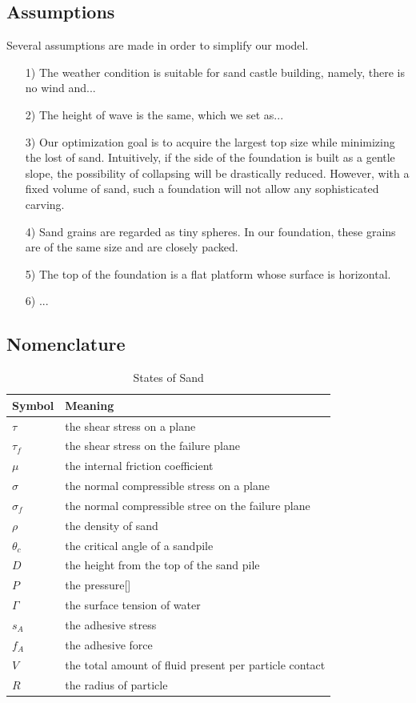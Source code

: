 \documentclass[12pt]{article}
\begin{document}
\subsection{Assumptions}
Several assumptions are made in order to simplify our model.
\begin{itemize}
	\item [1)] 
	The weather condition is suitable for sand castle building, namely, there is no wind and...
	\item [2)]
	The height of wave is the same, which we set as...
	\item [3)]
	Our optimization goal is to acquire the largest top size while minimizing the lost of sand. Intuitively, if the side of the foundation is built as a gentle slope, the possibility of collapsing will be drastically reduced. However, with a fixed volume of sand, such a foundation will not allow any sophisticated carving.
	\item [4)]
	Sand grains are regarded as tiny spheres. In our foundation, these grains are of the same size and are closely packed. 
	\item [5)]
	The top of the foundation is a flat platform whose surface is horizontal.
	\item [6)]
	...
\end{itemize}
\subsection{Nomenclature}
\begin{table}[H]
	\caption{States of Sand}
	\vspace{5pt}
	\centering
	\begin{tabular}{p{3cm}p{12cm}}
		\hline
		Symbol & Meaning \\
		\hline
		$\tau$   & the shear stress on a plane \\
		$\tau_f$ & the shear stress on the failure plane\\
		$\mu$    & the internal friction coefficient \\
		$\sigma$ & the normal compressible stress on a plane \\
		$\sigma_f$ & the normal compressible stree on the failure plane \\
		$\rho$   & the density of sand \\ 
		$\theta_c$ & the critical angle of a sandpile\\
		$D$ & the height from the top of the sand pile \\
		$P$ & the pressure[] \\
		$\Gamma$ & the surface tension of water \\
		$s_A$ & the adhesive stress \\
		$f_A$ & the adhesive force \\
		$V$ & the total amount of fluid present per particle contact \\
		$R$ & the radius of particle \\
		\hline       
	\end{tabular}
	\label{bs2}
\end{table}
\end{document}
